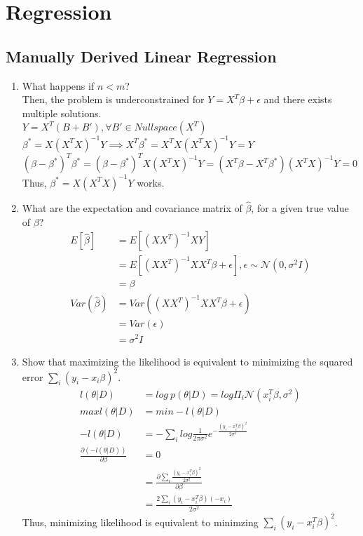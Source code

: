 \documentclass[12pt,letter]{article}
\begin{document}
\pagebreak

\section{Regression}

\subsection{Manually Derived Linear Regression}
\begin{enumerate}
\item What happens if $n < m$?\\
  
  Then, the problem is underconstrained for $Y=X^T\beta + \epsilon$ and there exists multiple solutions.\\
  $Y=X^T(B+B'), \forall B' \in Nullspace(X^T)$\\
  $\beta^*=X(X^TX)^{-1}Y \implies X^T\beta^* = X^TX(X^TX)^{-1}Y = Y $\\
  $(\beta-\beta^*)^T\beta^* = (\beta-\beta^*)^TX(X^TX)^{-1}Y = (X^T\beta-X^T\beta^*)(X^TX)^{-1}Y = 0$\\
  Thus, $\beta^*=X(X^TX)^{-1}Y$ works.
  
\item What are the expectation and covariance matrix of $\hat{\beta}$, for a given true value of $\beta$?
  \begin{align*}
    E[\hat{\beta}] &= E[(XX^T)^{-1} XY]\\
                   &= E[(XX^T)^{-1} XX^T\beta+\epsilon], \epsilon \sim \mathcal{N}(0,\sigma^2 I)\\
                   &= \beta\\
    Var(\hat{\beta}) &= Var((XX^T)^{-1} XX^T\beta+\epsilon)\\
                   &= Var(\epsilon)\\
                   &= \sigma^2 I
  \end{align*}
\item Show that maximizing the likelihood is equivalent to minimizing the squared error $\sum_i(y_i - x_i \beta)^2$.
  \begin{align*}
    l(\theta|D) &= log\ p(\theta|D) = log \Pi_i \mathcal{N}(x_i^T\beta, \sigma^2)\\
    max l(\theta|D) &= min -l(\theta|D)\\
    -l(\theta|D) &= -\sum_i log \frac{1}{2 \pi \sigma^2} e^{-\frac{(y_i-x_i^T \beta)^2}{2\sigma^2}}\\
    \frac{\partial (-l(\theta|D))}{\partial \beta} &= 0 \\
                &= \frac{\partial \sum_i \frac{(y_i-x_i^T \beta)^2}{2\sigma^2}}{\partial \beta}\\
                &= \frac{2\sum_i (y_i-x_i^T \beta) (-x_i) }{2\sigma^2}
  \end{align*}
  Thus, minimizing likelihood is equivalent to minimzing $\sum_i (y_i-x_i^T \beta)^2$.\\


\end{enumerate}
\end{document}
